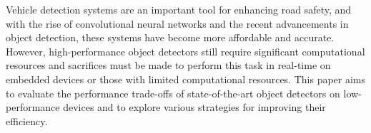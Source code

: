 

Vehicle detection systems are an important tool for enhancing road safety, and
with the rise of convolutional neural networks and the recent advancements in
object detection, these systems have become more affordable and accurate.
However, high-performance object detectors still require significant
computational resources and sacrifices must be made to perform this task in
real-time on embedded devices or those with limited computational resources.
This paper aims to evaluate the performance trade-offs of state-of-the-art
object detectors on low-performance devices and to explore various strategies
for improving their efficiency.

